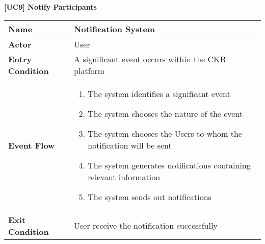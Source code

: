 \documentclass{article}
\begin{document}
\begin{table}
 \renewcommand{\arraystretch}{1.5}
    \centering
    \raggedright\textbf{[UC9] Notify Participants}
    \begin{tabular}{|l|p{10cm}|}
        \hline
        \textbf{Name} & Notification System \\
        \hline
        \textbf{Actor} & User \\
        \hline
        \textbf{Entry Condition} & A significant event occurs within the CKB platform\\
        \hline
        \textbf{Event Flow} & 
        \begin{enumerate}[align=left, topsep=0pt, partopsep=0pt]
            \item The system identifies a significant event
            \item The system chooses the nature of the event
            \item The system chooses the Users to whom the notification will be sent
            \item The system generates notifications containing relevant information
            \item The system sends out notifications
        \end{enumerate} \\
        \hline
        \textbf{Exit Condition} & User receive the notification successfully \\
        \hline
    \end{tabular}
\end{table}
\end{document}
